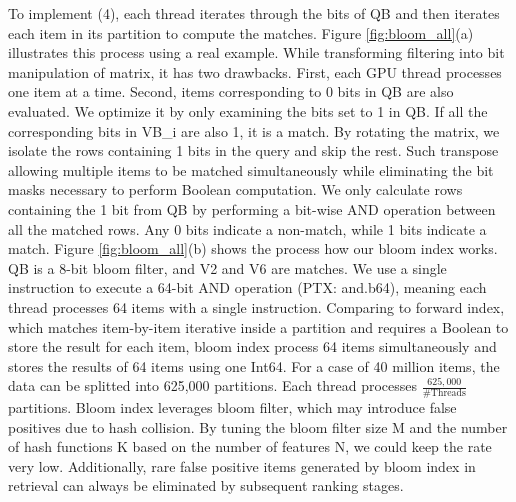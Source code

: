 To implement (4), each thread iterates through the bits of QB and then iterates each item in its partition to compute the matches. Figure \ref{fig:bloom_all}(a) illustrates this process using a real example. While transforming filtering into bit manipulation of matrix, it has two drawbacks. First, each GPU thread processes one item at a time. Second, items corresponding to 0 bits in QB are also evaluated. We optimize it by only examining the bits set to 1 in QB. If all the corresponding bits in VB\_i are also 1, it is a match. By rotating the matrix, we isolate the rows containing 1 bits in the query and skip the rest. Such transpose allowing multiple items to be matched simultaneously while eliminating the bit masks necessary to perform Boolean computation.
We only calculate rows containing the 1 bit from QB by performing a bit-wise AND operation between all the matched rows. Any 0 bits indicate a non-match, while 1 bits indicate a match. Figure \ref{fig:bloom_all}(b) shows the process how our bloom index works. QB is a 8-bit bloom filter, and V2 and V6 are matches.
We use a single instruction to execute a 64-bit AND operation (PTX: and.b64), meaning each thread processes 64 items with a single instruction. Comparing to forward index, which matches item-by-item iterative inside a partition and requires a Boolean to store the result for each item, bloom index process 64 items simultaneously and stores the results of 64 items using one Int64. For a case of 40 million items, the data can be splitted into 625,000 partitions. Each thread processes $\frac{625,000}{\text{\#Threads}}$ partitions.
Bloom index leverages bloom filter, which may introduce false positives due to hash collision. By tuning the bloom filter size M and the number of hash functions K based on the number of features N, we could keep the rate very low. Additionally, rare false positive items generated by bloom index in retrieval can always be eliminated by subsequent ranking stages.

